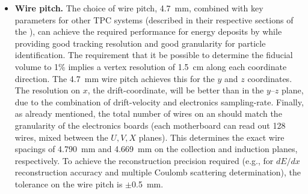 \begin{itemize}
\item \textbf{Wire pitch.} The choice of wire pitch, \SI{4.7}{mm}, combined with key parameters for other TPC systems (described in their respective sections of the ), can achieve the required performance for energy deposits by  while providing good tracking resolution and good granularity for particle identification. The \single requirement that it be possible to determine the fiducial volume to \num{1}\% implies a vertex resolution of \SI{1.5}{cm} along each coordinate direction. The \SI{4.7}{mm} wire pitch achieves this for the $y$ and $z$ coordinates.  The resolution on $x$, the drift-coordinate, will be better than in the $y$--$z$ plane, due to the combination of drift-velocity and electronics sampling-rate.  Finally, as already mentioned, the total number of wires on an  should match the granularity of the electronics boards (each  motherboard can read out \num{128} wires, mixed between the $U,V,X$ planes). This determines the exact wire spacings of \SI{4.790}{mm} and \SI{4.669}{mm} on the collection and induction planes, respectively.  To achieve the reconstruction precision required (e.g., for $dE/dx$ reconstruction accuracy and multiple Coulomb scattering determination), the tolerance on the wire pitch is $\pm$\SI{0.5}{mm}.


\end{itemize}
